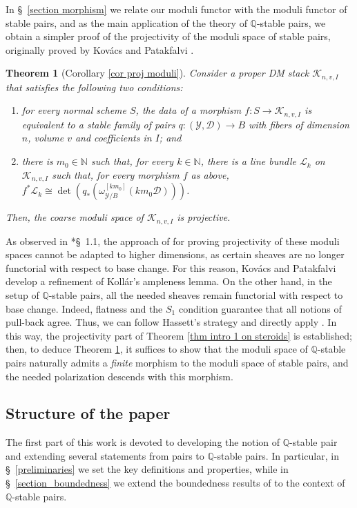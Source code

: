 \documentclass{amsart}
\newcommand{\bQ}{\mathbb{Q}}
\newcommand{\cD}{\mathcal{D}}
\newcommand{\cK}{\mathcal{K}}
\newcommand{\cL}{\mathcal{L}}
\newcommand{\cY}{\mathcal{Y}}
\newtheorem{theorem}{Theorem}[section]
\theoremstyle{definition}
\begin{document}
In \S~\ref{section morphism} we relate our moduli functor with the moduli functor of stable pairs, and as the main application of the theory of $\bQ$-stable pairs, we obtain a simpler proof of the projectivity of the moduli space of stable pairs, originally proved by Kov\'acs and Patakfalvi \cite{KP17}.

\begin{theorem}[Corollary \ref{cor proj moduli}] \label{thm intro 2}
Consider a proper DM stack $ \cK_{n,v,I}$ that satisfies the following two conditions:
\begin{enumerate}
    \item for every normal scheme $S$, the data of a morphism $f \colon S\to \cK_{n,v,I}$ is equivalent to a stable family of pairs $q \colon (\cY,\cD)\to B$ with fibers of dimension $n$, volume $v$ and coefficients in $I$; and
    \item there is $m_0\in \mathbb{N}$ such that, for every $k \in \mathbb{N}$, there is a line bundle $\cL_k$ on $\cK_{n,v,I}$ such that, for every morphism $f$ as above, $f^*\cL_k \cong \det(q_*(\omega_{\cY/B}^{[km_0]}(km_0\cD)))$.
\end{enumerate}
Then, the coarse moduli space of $\cK_{n,v,I}$ is projective. 
\end{theorem}

As observed in \cite{KP17}*{\S~1.1}, the approach of \cite{Has03} for proving projectivity of these moduli spaces cannot be adapted to higher dimensions, as certain sheaves are no longer functorial with respect to base change.
For this reason, Kov\'acs and Patakfalvi develop a refinement of Koll\'ar's ampleness lemma.
On the other hand, in the setup of $\bQ$-stable pairs, all the needed sheaves remain functorial with respect to base change.
Indeed, flatness and the $S_1$ condition guarantee that all notions of pull-back agree.
Thus, we can follow Hassett's strategy and directly apply \cite{Kol90}.
In this way, the projectivity part of Theorem \ref{thm intro 1 on steroids} is established;
then, to deduce Theorem \ref{thm intro 2}, it suffices to show that the moduli space of $\bQ$-stable pairs naturally admits a \emph{finite} morphism to the moduli space of stable pairs, and the needed polarization descends with this morphism.

\subsection{Structure of the paper}
\label{struttura}
The first part of this work is devoted to developing the notion of $\bQ$-stable pair and extending several statements from pairs to $\bQ$-stable pairs.
In particular, in \S~\ref{preliminaries} we set the key definitions and properties, while in \S~\ref{section_boundedness} we extend the boundedness results of \cite{HMX18} to the context of $\bQ$-stable pairs.
\end{document}

